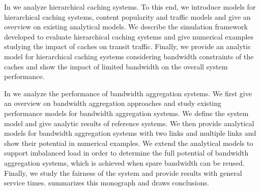 In  we analyze hierarchical caching systems.
To this end, we introduce models for hierarchical caching systems, content popularity and traffic models and give an overview on existing analytical models.
We describe the simulation framework developed to evaluate hierarchical caching systems and give numerical examples studying the impact of caches on transit traffic.
Finally, we provide an analytic model for hierarchical caching systems considering bandwidth constraints of the caches and show the impact of limited bandwidth on the overall system performance.

In  we analyze the performance of bandwidth aggregation systems.
We first give an overview on bandwidth aggregation approaches and study existing performance models for bandwidth aggregation systems.
We define the system model and give analytic results of reference systems.
We then provide analytical models for bandwidth aggregation systems with two links and multiple links and show their potential in numerical examples.
We extend the analytical models to support imbalanced load in order to determine the full potential of bandwidth aggregation systems, which is achieved when spare bandwidth can be reused.
Finally, we study the fairness of the system and provide results with general service times.
 summarizes this monograph and draws conclusions.
